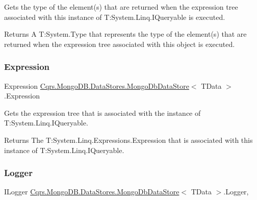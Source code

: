 Gets the type of the element(s) that are returned when the expression tree associated with this instance of T\+:\+System.\+Linq.\+I\+Queryable is executed. 

\begin{DoxyReturn}{Returns}
A T\+:\+System.\+Type that represents the type of the element(s) that are returned when the expression tree associated with this object is executed. 
\end{DoxyReturn}
\mbox{\label{classCqrs_1_1MongoDB_1_1DataStores_1_1MongoDbDataStore_ade387c1d511dfad22ff7eb752fb842e5}} 
\subsubsection{\texorpdfstring{Expression}{Expression}}
{\footnotesize\ttfamily Expression \hyperlink{classCqrs_1_1MongoDB_1_1DataStores_1_1MongoDbDataStore}{Cqrs.\+Mongo\+D\+B.\+Data\+Stores.\+Mongo\+Db\+Data\+Store}$<$ T\+Data $>$.Expression\hspace{0.3cm}{\ttfamily [get]}}



Gets the expression tree that is associated with the instance of T\+:\+System.\+Linq.\+I\+Queryable. 

\begin{DoxyReturn}{Returns}
The T\+:\+System.\+Linq.\+Expressions.\+Expression that is associated with this instance of T\+:\+System.\+Linq.\+I\+Queryable. 
\end{DoxyReturn}
\mbox{\label{classCqrs_1_1MongoDB_1_1DataStores_1_1MongoDbDataStore_a1258497689d7f866b2bc219cd8268b7d}} 
\subsubsection{\texorpdfstring{Logger}{Logger}}
{\footnotesize\ttfamily I\+Logger \hyperlink{classCqrs_1_1MongoDB_1_1DataStores_1_1MongoDbDataStore}{Cqrs.\+Mongo\+D\+B.\+Data\+Stores.\+Mongo\+Db\+Data\+Store}$<$ T\+Data $>$.Logger\hspace{0.3cm}{\ttfamily [get]}, {\ttfamily [protected]}}

